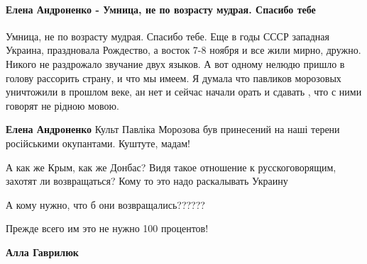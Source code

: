  
 
 
 
 
\paragraph{Елена Андроненко - Умница, не по возрасту мудрая. Спасибо тебе}
\label{sec:18_06_2020.fb.zharkih_ekaterina.1.mova_jazyk.cmt.andronenko_umnica}

\begin{itemize}

Умница, не по возрасту мудрая. Спасибо тебе. Еще в годы СССР западная Украина,
праздновала Рождество, а восток 7-8 ноября и все жили мирно, дружно. Никого не
раздрожало звучание двух языков. А вот одному нелюдю пришло в голову рассорить
страну, и что мы имеем. Я думала что павликов морозовых уничтожили в прошлом
веке, ан нет и сейчас начали орать и сдавать , что с ними говорят не рідною
мовою.

\begin{itemize}
\textbf{Елена Андроненко} Культ Павліка Морозова був принесений на наші терени
російськими окупантами. Куштуте, мадам!
\end{itemize}


А как же Крым, как же Донбас? Видя такое отношение к русскоговорящим, захотят
ли возвращаться? Кому то это надо раскалывать Украину

\begin{itemize}
А кому нужно, что б они возвращались??????


Прежде всего им это не нужно 100 процентов!


\textbf{Алла Гаврилюк} 


\end{itemize}
\end{itemize}
